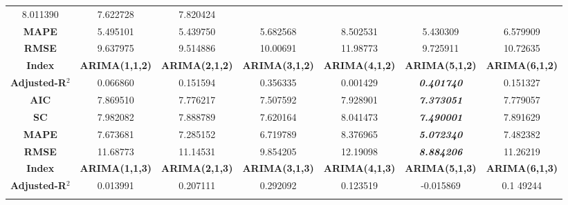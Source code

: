\documentclass[12pt]{article}  %
\begin{document}
\begin{table}[!ht]
{\begin{tabular}{ccccccc}
  8.011390 &
  7.622728 &
  7.820424 \\
\rowcolor[HTML]{F5FCF7} 
\cellcolor[HTML]{D3EEDB}\textbf{MAPE} &
  5.495101 &
  5.439750 &
  5.682568 &
  8.502531 &
  5.430309 &
  6.579909 \\
\rowcolor[HTML]{F5FCF7} 
\cellcolor[HTML]{D3EEDB}\textbf{RMSE} &
  9.637975 &
  9.514886 &
  10.00691 &
  11.98773 &
  9.725911 &
  10.72635 \\ \hline
\rowcolor[HTML]{FFFFFF} 
{\color[HTML]{35834D} \textbf{Index}} &
  {\color[HTML]{35834D} \textbf{ARIMA(1,1,2)}} &
  {\color[HTML]{35834D} \textbf{ARIMA(2,1,2)}} &
  {\color[HTML]{35834D} \textbf{ARIMA(3,1,2)}} &
  {\color[HTML]{35834D} \textbf{ARIMA(4,1,2)}} &
  {\color[HTML]{35834D} \textbf{ARIMA(5,1,2)}} &
  {\color[HTML]{35834D} \textbf{ARIMA(6,1,2)}} \\
\rowcolor[HTML]{F5FCF7} 
\cellcolor[HTML]{D3EEDB}\textbf{Adjusted-R$^2$} &
  0.066860 &
  0.151594 &
  0.356335 &
  0.001429 &
  {\color[HTML]{CB0000} \textit{\textbf{0.401740}}} &
  0.151327 \\
\rowcolor[HTML]{F5FCF7} 
\cellcolor[HTML]{D3EEDB}\textbf{AIC} &
  7.869510 &
  7.776217 &
  7.507592 &
  7.928901 &
  {\color[HTML]{CB0000} \textit{\textbf{7.373051}}} &
  7.779057 \\
\rowcolor[HTML]{F5FCF7} 
\cellcolor[HTML]{D3EEDB}\textbf{SC} &
  7.982082 &
  7.888789 &
  7.620164 &
  8.041473 &
  {\color[HTML]{CB0000} \textit{\textbf{7.490001}}} &
  7.891629 \\
\rowcolor[HTML]{F5FCF7} 
\cellcolor[HTML]{D3EEDB}\textbf{MAPE} &
  7.673681 &
  7.285152 &
  6.719789 &
  8.376965 &
  {\color[HTML]{CB0000} \textit{\textbf{5.072340}}} &
  7.482382 \\
\rowcolor[HTML]{F5FCF7} 
\cellcolor[HTML]{D3EEDB}\textbf{RMSE} &
  11.68773 &
  11.14531 &
  9.854205 &
  12.19098 &
  {\color[HTML]{CB0000} \textit{\textbf{8.884206}}} &
  11.26219 \\ \hline
\rowcolor[HTML]{FFFFFF} 
{\color[HTML]{35834D} \textbf{Index}} &
  {\color[HTML]{35834D} \textbf{ARIMA(1,1,3)}} &
  {\color[HTML]{35834D} \textbf{ARIMA(2,1,3)}} &
  {\color[HTML]{35834D} \textbf{ARIMA(3,1,3)}} &
  {\color[HTML]{35834D} \textbf{ARIMA(4,1,3)}} &
  {\color[HTML]{35834D} \textbf{ARIMA(5,1,3)}} &
  {\color[HTML]{35834D} \textbf{ARIMA(6,1,3)}} \\
\rowcolor[HTML]{F5FCF7} 
\cellcolor[HTML]{D3EEDB}\textbf{Adjusted-R$^2$} &
  0.013991 &
  0.207111 &
  0.292092 &
  0.123519 &
  -0.015869 &
  0.1 49244 \\
\rowcolor[HTML]{F5FCF7} 

\end{tabular}}
\end{table}
\end{document}
